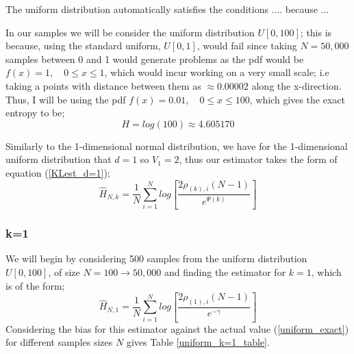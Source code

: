 \documentclass{article}
\begin{document}
The uniform distribution automatically satisfies the conditions .... because ... 

In our samples we will be consider the uniform distribution $U[0,100]$; this is because, using the standard uniform, $U[0,1]$, would fail since taking $N=50,000$ samples between 0 and 1 would generate problems as the pdf would be $f(x) = 1 , \quad 0 \leq x \leq 1$, which would incur working on a very small scale; i.e taking a points with distance between them as $\approx 0.00002$ along the x-direction. Thus, I will be using the pdf $f(x) = 0.01 , \quad 0 \leq x \leq 100$, which gives the exact entropy to be;
\begin{equation} \label{uniform_exact}
H = log(100) \approx 4.605170
\end{equation}

Similarly to the 1-dimensional normal distribution, we have for the 1-dimensional uniform distribution that $d=1$ so $V_{1} = 2$, thus our estimator takes the form of equation (\ref{KLest_d=1});
\begin{equation}
\hat{H}_{N, k} =  \frac{1}{N} \sum_{i=1}^{N} log \left[ \frac{2\rho_{(k),i}(N-1)}{e^{\Psi(k)}} \right]\nonumber
\end{equation}




\subsubsection{k=1} \label{U_k=1}
We will begin by considering 500 samples from the uniform distribution $U[0,100]$, of size $N=100 \to 50,000$ and finding the estimator for $k=1$, which is of the form;
\begin{equation} 
\hat{H}_{N, 1} = \frac{1}{N} \sum_{i=1}^{N} log \left[ \frac{2\rho_{(1),i} (N-1)}{e^{-\gamma}} \right] \nonumber
\end{equation}
Considering the bias for this estimator against the actual value (\ref{uniform_exact}) for different samples sizes $N$ gives Table \ref{uniform_k=1_table}.
\end{document}
